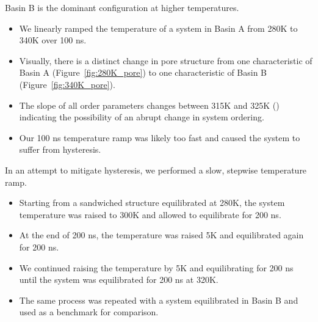 \documentclass{article}
\begin{document}
  Basin B is the dominant configuration at higher temperatures.
  \begin{itemize}
	\item We linearly ramped the temperature of a system in Basin A 
	from 280K to 340K over 100 ns.
        \item Visually, there is a distinct change in pore structure from one
        characteristic of Basin A (Figure~\ref{fig:280K_pore}) to one characteristic of
        Basin B (Figure~\ref{fig:340K_pore}).
        \item The slope of all order parameters changes between 315K and 325K
	() indicating the
        possibility of an abrupt change in system ordering.
        \item Our 100 ns temperature ramp was likely too fast and caused the system
        to suffer from hysteresis.
  \end{itemize}

  In an attempt to mitigate hysteresis, we performed a slow, stepwise temperature ramp.
  \begin{itemize}
        \item Starting from a sandwiched structure equilibrated at 280K, the system
        temperature was raised to 300K and allowed to equilibrate for 200 ns.
        \item At the end of 200 ns, the temperature was raised 5K and equilibrated
        again for 200 ns.
        \item We continued raising the temperature by 5K and equilibrating for 200 ns
        until the system was equilibrated for 200 ns at 320K.
	\item The same process was repeated with a system equilibrated in Basin B and used
	as a benchmark for comparison. 
  \end{itemize}
\end{document}
